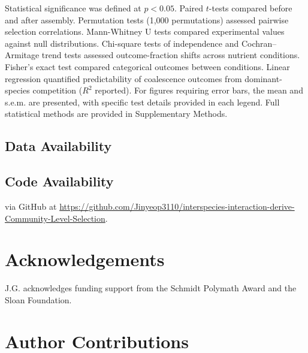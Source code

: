 Statistical significance was defined at $p < 0.05$.  Paired $t$-tests compared  before and after assembly. Permutation tests (1,000 permutations) assessed pairwise selection correlations. Mann-Whitney U tests compared experimental values against null distributions. Chi-square tests of independence and Cochran--Armitage trend tests assessed outcome-fraction shifts across nutrient conditions. Fisher's exact test compared categorical outcomes between conditions. Linear regression quantified predictability of coalescence outcomes from dominant-species competition ($R^2$ reported). For figures requiring error bars, the mean and s.e.m. are presented, with specific test details provided in each legend. Full statistical methods are provided in Supplementary Methods.


\subsection*{Data Availability}
\label{sec:methods:data}



\subsection*{Code Availability}
\label{sec:methods:code}

 via GitHub at \url{https://github.com/Jinyeop3110/interspecies-interaction-derive-Community-Level-Selection}.



\section*{Acknowledgements}
\label{sec:acknowledgements}

J.G. acknowledges funding support from the Schmidt Polymath Award and the Sloan Foundation.


\section*{Author Contributions}
\label{sec:contributions}

